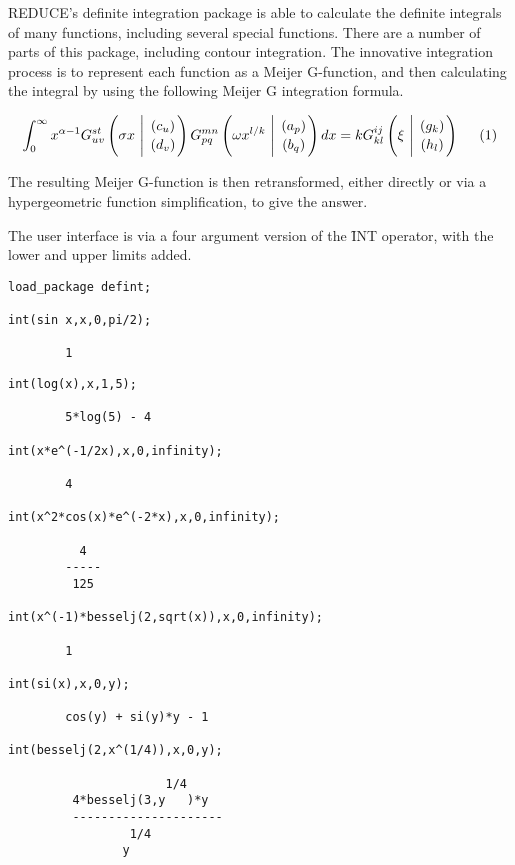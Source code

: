 \documentclass[11pt,letterpaper]{book}
\makeatletter
\newcommand{\REDUCE}{REDUCE}
\newcommand{\underscore}{\_}
\newcommand{\ttindex}[1]{{\renewcommand{\_}{\protect\underscore}%
                          \index{#1@{\tt #1}}}}
\makeatother
\begin{document}
\ttindex{DEFINT}

\REDUCE{}'s definite integration package is able to calculate the
definite integrals of many functions, including several special
functions.  There are a number of parts of this package, including
contour integration.  The innovative integration process is to
represent each function as a Meijer G-function, and then calculating
the integral by using the following Meijer G integration formula.

\begin{displaymath}
\int_{0}^{\infty} x^{\alpha-1} G^{s t}_{u v}
\left( \sigma x \  \Bigg\vert \  {( c_u) \atop (d_v)} \right)
G^{m n}_{p q} \left( \omega x^{l/k} \  \Bigg\vert \ {(a_p) \atop (b_q)}
\right) dx = k G^{i j}_{k l} \left( \xi \ \Bigg\vert \
{(g_k) \atop (h_l)} \right)  \hspace{5mm} (1)
\end{displaymath}

The resulting Meijer G-function is then retransformed, either directly
or via a hypergeometric function simplification, to give
the answer.

The user interface is via a four argument version of the
\f{INT}\ttindex{INT} operator, with the lower and upper limits added.

{\small\begin{verbatim}
load_package defint;

int(sin x,x,0,pi/2);

        1
\end{verbatim}}
\newpage
{\small\begin{verbatim}
int(log(x),x,1,5);

        5*log(5) - 4

int(x*e^(-1/2x),x,0,infinity);

        4

int(x^2*cos(x)*e^(-2*x),x,0,infinity);

          4
        -----
         125

int(x^(-1)*besselj(2,sqrt(x)),x,0,infinity);

        1

int(si(x),x,0,y);

        cos(y) + si(y)*y - 1

int(besselj(2,x^(1/4)),x,0,y);

                      1/4
         4*besselj(3,y   )*y
         ---------------------
                 1/4
                y
\end{verbatim}}
\end{document}
